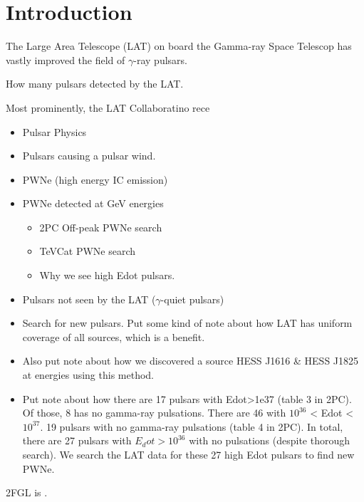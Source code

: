 \section{Introduction}

The Large Area Telescope (LAT) on board the \fermi Gamma-ray Space Telescop has vastly improved
the field of $\gamma$-ray pulsars. 

How many pulsars detected by the LAT.

Most prominently, the LAT Collaboratino rece



\begin{itemize}
  \item Pulsar Physics
  \item Pulsars causing a pulsar wind.
  \item PWNe (high energy IC emission)
  \item PWNe detected at GeV energies
  \begin{itemize}
    \item 2PC Off-peak PWNe search
    \item TeVCat PWNe search
    \item Why we see high Edot pulsars.
  \end{itemize}
  \item Pulsars not seen by the LAT ($\gamma$-quiet pulsars)
  \item Search for new pulsars. Put some kind of note about how LAT has
  uniform coverage of all sources, which is a benefit.
  \item Also put note about how we discovered a source HESS J1616 \&
  HESS J1825 at \gev energies using this method.
\item Put note about how there are 17 pulsars with Edot>1e37 (table 3 in 2PC).
  Of those, 8 has no gamma-ray pulsations. There are 46 with $10^{36}$ < Edot < $10^{37}$.
  19 pulsars with no gamma-ray pulsations (table 4 in 2PC). 
  In total, there are 27 pulsars with $E_dot>10^{36}$ with no pulsations
  (despite thorough search). We search the LAT data for these 27 high Edot pulsars to find
  new PWNe.
\end{itemize}

2FGL is \citep{LAT_Collaboration_2FGL_2012}.

